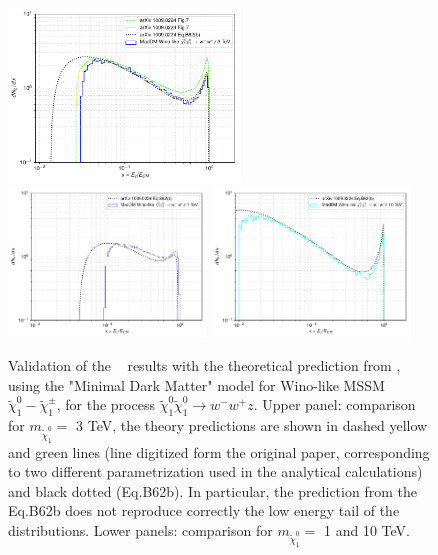 \documentclass[epj,nopacs,fleqn]{svjour}
\begin{document}
\begin{figure}[!h]
	\centering
	\subfigure
	{ \includegraphics[width=0.55\textwidth]{Fig/Validation_1009/n1n1_wwz_3000.pdf} }
	\subfigure
	{ \includegraphics[width=0.47\textwidth]{Fig/Validation_1009/n1n1_wwz_1000.pdf} }
	\subfigure
    { \includegraphics[width=0.47\textwidth]{Fig/Validation_1009/n1n1_wwz_10000.pdf} }
	
	\caption{Validation of the \maddm~ results with the theoretical prediction from \cite{Ciafaloni:2010ti}, using the "Minimal Dark Matter" model for Wino-like MSSM $\tilde \chi_1 ^0-\tilde \chi_1 ^{\pm}$, for the process  $\tilde \chi _1 ^0  \tilde \chi _1 ^0 \rightarrow w^- w^+ z$. Upper panel: comparison for $m_{\tilde \chi_1 ^0}=$ 3 TeV, the theory predictions are shown in dashed yellow and green lines (line digitized form the original paper, corresponding to two different parametrization used in the analytical calculations) and black dotted (Eq.B62b). In particular, the prediction from the Eq.B62b does not reproduce correctly the low energy tail of the distributions. Lower panels: comparison for  $m_{\tilde \chi_1 ^0}=$ 1 and 10 TeV.  }
	\label{minimal_z}
\end{figure}
\end{document}

